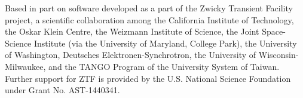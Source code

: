 \documentclass[twocolumn, dvipdfmx]{aastex62}
\begin{document}
\begin{CJK*}{UTF8}{gbsn}
Based in part on software developed as a part of the Zwicky Transient Facility project, a scientific collaboration among the California Institute of Technology, the Oskar Klein Centre, the Weizmann Institute of Science, the Joint Space-Science Institute (via the University of Maryland, College Park), the University of Washington, Deutsches Elektronen-Synchrotron, the University of Wisconsin-Milwaukee, and the TANGO Program of the University System of Taiwan. Further support for ZTF is provided by the U.S. National Science Foundation under Grant No. AST-1440341.








\end{CJK*}
\end{document}
